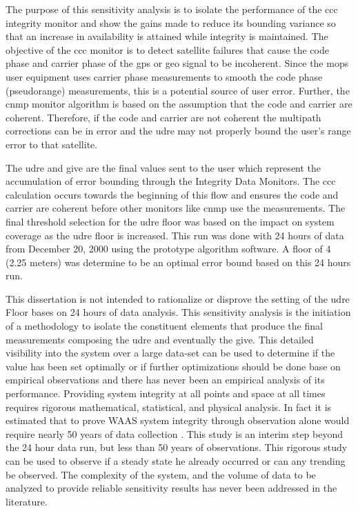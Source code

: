 The purpose of this sensitivity analysis is to isolate the performance of the \ac{ccc} integrity monitor and show the gains made to reduce its bounding variance so that an increase in availability is attained while integrity is maintained. The objective of the \ac{ccc} monitor is to detect satellite failures that cause the code phase and carrier phase of the \ac{gps} or \ac{geo} signal to be incoherent. Since the \ac{mops} user equipment uses carrier phase measurements to smooth the code phase (pseudorange) measurements, this is a potential source of user error. Further, the \ac{cnmp} monitor algorithm is based on the assumption that the code and carrier are coherent. Therefore, if the code and carrier are not coherent the multipath corrections can be in error and the \ac{udre} may not properly bound the user’s range error to that satellite.

The \ac{udre} and \ac{give} are the final values sent to the user which represent the accumulation of error bounding through the Integrity Data Monitors.  The \ac{ccc} calculation occurs towards the beginning of this flow and ensures the code and carrier are coherent before other monitors like \ac{cnmp} use the measurements. The final threshold selection for the \ac{udre} floor was based on the impact on system coverage as the \ac{udre} floor is increased. This run was done with 24 hours of data from December 20, 2000 using the prototype algorithm software. A floor of 4 (2.25 meters) was determine to be an optimal error bound based on this 24 hours run.

This dissertation is not intended to rationalize or disprove the setting of the \ac{udre} Floor bases on 24 hours of data analysis.  This sensitivity analysis is the initiation of a methodology to isolate the constituent elements that produce the final measurements composing the \ac{udre} and eventually the \ac{give}.  This detailed visibility into the system over a large data-set can be used to determine if the value has been set optimally or if further optimizations should be done base on empirical observations and there has never been an empirical analysis of its performance. Providing system integrity at all points and space at all times requires rigorous mathematical, statistical, and physical analysis. In fact it is estimated that to prove WAAS system integrity through observation alone would require nearly 50 years of data collection \citep[]{HOUSE-JUNE-2000}. This study is an interim step beyond the 24 hour data run, but less than 50 years of observations.  This rigorous study can be used to observe if a steady state he already occurred or can any trending be observed. The complexity of the system, and the volume of data to be analyzed to provide reliable sensitivity results has never been addressed in the literature.


